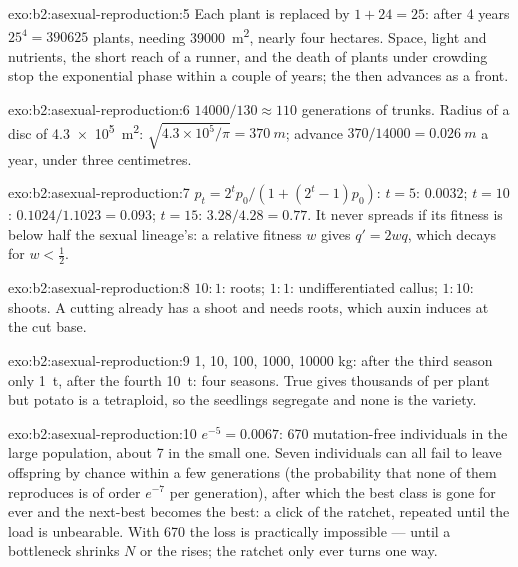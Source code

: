 \begin{solution}{exo:b2:asexual-reproduction:5}
Each plant is replaced by $1 + 24 = 25$: after 4 years $25^{4} =
\num{390625}$ plants, needing \qty{39000}{m^2}, nearly four hectares.
Space, light and nutrients, the short reach of a runner, and the
death of plants under crowding stop the exponential phase within a
couple of years; the  then advances as a front.
\end{solution}

\begin{solution}{exo:b2:asexual-reproduction:6}
$\num{14000}/130 \approx 110$ generations of trunks. Radius of a disc
of \qty{4.3e5}{m^2}: $\sqrt{4.3\times 10^{5}/\pi} = \qty{370}{m}$;
advance $370/\num{14000} = \qty{0.026}{m}$ a year, under three
centimetres.
\end{solution}

\begin{solution}{exo:b2:asexual-reproduction:7}
$p_t = 2^{t}p_0/(1 + (2^{t} - 1)p_0)$: $t = 5$: $0.0032$; $t = 10$:
$0.1024/1.1023 = 0.093$; $t = 15$: $3.28/4.28 = 0.77$. It never
spreads if its fitness is below half the sexual lineage's: a
relative fitness $w$ gives $q' = 2wq$, which decays for $w <
\tfrac12$.
\end{solution}

\begin{solution}{exo:b2:asexual-reproduction:8}
$10 : 1$: roots; $1 : 1$: undifferentiated callus; $1 : 10$: shoots.
A cutting already has a shoot and needs roots, which auxin induces
at the cut base.
\end{solution}

\begin{solution}{exo:b2:asexual-reproduction:9}
1, 10, 100, \num{1000}, \num{10000} kg: after the third season only
\qty{1}{t}, after the fourth \qty{10}{t}: four seasons. True 
gives thousands of  per plant but potato is a 
tetraploid, so the seedlings segregate and none is the variety.
\end{solution}

\begin{solution}{exo:b2:asexual-reproduction:10}
$e^{-5} = 0.0067$: 670 mutation-free individuals in the large
population, about 7 in the small one. Seven individuals can all
fail to leave offspring by chance within a few generations (the
probability that none of them reproduces is of order $e^{-7}$ per
generation), after which the best class is gone for ever and the
next-best becomes the best: a click of the ratchet, repeated until
the load is unbearable. With 670 the loss is practically impossible
--- until a bottleneck shrinks $N$ or the  rises; the
ratchet only ever turns one way.
\end{solution}


